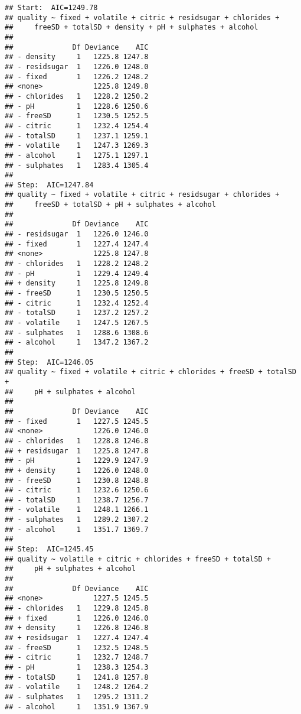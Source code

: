 \documentclass[
]{article}
\newenvironment{Shaded}{\begin{snugshade}}{\end{snugshade}}
\newcommand{\NormalTok}[1]{#1}
\newcommand{\SpecialCharTok}[1]{\textcolor[rgb]{0.00,0.00,0.00}{#1}}
\begin{document}
\begin{verbatim}
## Start:  AIC=1249.78
## quality ~ fixed + volatile + citric + residsugar + chlorides + 
##     freeSD + totalSD + density + pH + sulphates + alcohol
## 
##              Df Deviance    AIC
## - density     1   1225.8 1247.8
## - residsugar  1   1226.0 1248.0
## - fixed       1   1226.2 1248.2
## <none>            1225.8 1249.8
## - chlorides   1   1228.2 1250.2
## - pH          1   1228.6 1250.6
## - freeSD      1   1230.5 1252.5
## - citric      1   1232.4 1254.4
## - totalSD     1   1237.1 1259.1
## - volatile    1   1247.3 1269.3
## - alcohol     1   1275.1 1297.1
## - sulphates   1   1283.4 1305.4
## 
## Step:  AIC=1247.84
## quality ~ fixed + volatile + citric + residsugar + chlorides + 
##     freeSD + totalSD + pH + sulphates + alcohol
## 
##              Df Deviance    AIC
## - residsugar  1   1226.0 1246.0
## - fixed       1   1227.4 1247.4
## <none>            1225.8 1247.8
## - chlorides   1   1228.2 1248.2
## - pH          1   1229.4 1249.4
## + density     1   1225.8 1249.8
## - freeSD      1   1230.5 1250.5
## - citric      1   1232.4 1252.4
## - totalSD     1   1237.2 1257.2
## - volatile    1   1247.5 1267.5
## - sulphates   1   1288.6 1308.6
## - alcohol     1   1347.2 1367.2
## 
## Step:  AIC=1246.05
## quality ~ fixed + volatile + citric + chlorides + freeSD + totalSD + 
##     pH + sulphates + alcohol
## 
##              Df Deviance    AIC
## - fixed       1   1227.5 1245.5
## <none>            1226.0 1246.0
## - chlorides   1   1228.8 1246.8
## + residsugar  1   1225.8 1247.8
## - pH          1   1229.9 1247.9
## + density     1   1226.0 1248.0
## - freeSD      1   1230.8 1248.8
## - citric      1   1232.6 1250.6
## - totalSD     1   1238.7 1256.7
## - volatile    1   1248.1 1266.1
## - sulphates   1   1289.2 1307.2
## - alcohol     1   1351.7 1369.7
## 
## Step:  AIC=1245.45
## quality ~ volatile + citric + chlorides + freeSD + totalSD + 
##     pH + sulphates + alcohol
## 
##              Df Deviance    AIC
## <none>            1227.5 1245.5
## - chlorides   1   1229.8 1245.8
## + fixed       1   1226.0 1246.0
## + density     1   1226.8 1246.8
## + residsugar  1   1227.4 1247.4
## - freeSD      1   1232.5 1248.5
## - citric      1   1232.7 1248.7
## - pH          1   1238.3 1254.3
## - totalSD     1   1241.8 1257.8
## - volatile    1   1248.2 1264.2
## - sulphates   1   1295.2 1311.2
## - alcohol     1   1351.9 1367.9
\end{verbatim}

\begin{Shaded}
\end{Shaded}
\end{document}
